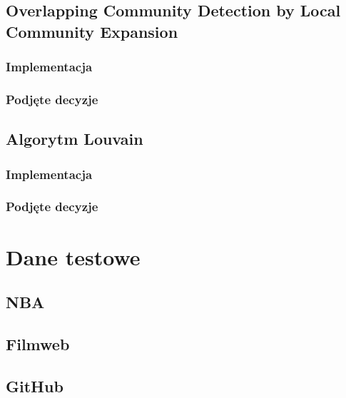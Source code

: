 \documentclass{article}
\begin{document}
\subsection{Overlapping Community Detection by Local Community Expansion}
\subsubsection{Implementacja}
\subsubsection{Podjęte decyzje}

\subsection{Algorytm Louvain}
\subsubsection{Implementacja}
\subsubsection{Podjęte decyzje}

\section{Dane testowe}

\subsection{NBA}

\subsection{Filmweb}

\subsection{GitHub}
\end{document}

